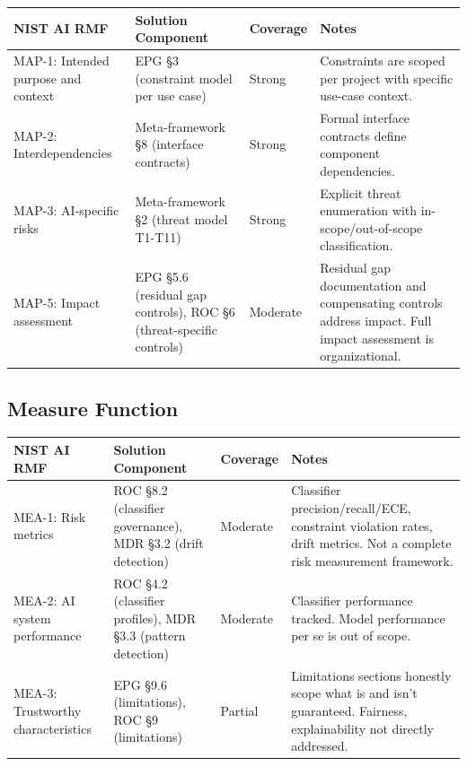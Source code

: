 \begin{table}[ht]
  \centering\small
  \begin{tabular}{@{}>{\raggedright\arraybackslash}p{2.13cm}>{\raggedright\arraybackslash}p{4.08cm}>{\raggedright\arraybackslash}p{1.10cm}>{\raggedright\arraybackslash}p{6.69cm}@{}}
  \toprule
  NIST AI RMF & Solution Component & Coverage & Notes \\
  \midrule
  MAP-1: Intended purpose and context & EPG \S{}3 (constraint model per use case) & Strong & Constraints are scoped per project with specific use-case context. \\
  MAP-2: Interdependencies & Meta-framework \S{}8 (interface contracts) & Strong & Formal interface contracts define component dependencies. \\
  MAP-3: AI-specific risks & Meta-framework \S{}2 (threat model T1-T11) & Strong & Explicit threat enumeration with in-scope/out-of-scope classification. \\
  MAP-5: Impact assessment & EPG \S{}5.6 (residual gap controls), ROC \S{}6 (threat-specific controls) & Moderate & Residual gap documentation and compensating controls address impact. Full impact assessment is organizational. \\
  \bottomrule
  \end{tabular}
\end{table}


\subsection{Measure Function}


\begin{table}[ht]
  \centering\small
  \begin{tabular}{@{}>{\raggedright\arraybackslash}p{2.07cm}>{\raggedright\arraybackslash}p{3.65cm}>{\raggedright\arraybackslash}p{1.10cm}>{\raggedright\arraybackslash}p{7.18cm}@{}}
  \toprule
  NIST AI RMF & Solution Component & Coverage & Notes \\
  \midrule
  MEA-1: Risk metrics & ROC \S{}8.2 (classifier governance), MDR \S{}3.2 (drift detection) & Moderate & Classifier precision/recall/ECE, constraint violation rates, drift metrics. Not a complete risk measurement framework. \\
  MEA-2: AI system performance & ROC \S{}4.2 (classifier profiles), MDR \S{}3.3 (pattern detection) & Moderate & Classifier performance tracked. Model performance per se is out of scope. \\
  MEA-3: Trustworthy characteristics & EPG \S{}9.6 (limitations), ROC \S{}9 (limitations) & Partial & Limitations sections honestly scope what is and isn't guaranteed. Fairness, explainability not directly addressed. \\
  \bottomrule
  \end{tabular}
\end{table}


